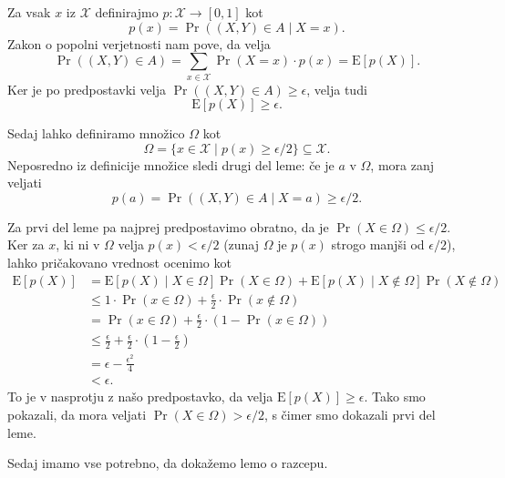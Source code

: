 \begin{dokaz}
    Za vsak $x$ iz $\mathcal{X}$ definirajmo $p: \mathcal{X} \rightarrow [0, 1]$ kot
    $$
    p(x) = \Pr((X, Y) \in A \mid X = x).
    $$
    Zakon o popolni verjetnosti nam pove, da velja
    $$
    \Pr((X, Y) \in A) = \sum_{x \in \mathcal{X}} \Pr(X = x) \cdot p(x) = \text{E}[p(X)].
    $$
    Ker je po predpostavki velja $\Pr((X, Y) \in A) \geq \epsilon$, velja tudi
    $$
    \text{E}[p(X)] \geq \epsilon.
    $$

    Sedaj lahko definiramo množico $\Omega$ kot
    $$
    \Omega = \{x \in \mathcal{X} \mid p(x) \geq \epsilon / 2\} \subseteq \mathcal{X}.
    $$
    Neposredno iz definicije množice sledi drugi del leme: če je $a$ v $\Omega$, mora zanj veljati
    $$
    p(a) = \Pr((X, Y) \in A \mid X = a) \geq \epsilon / 2.
    $$

    Za prvi del leme pa najprej predpostavimo obratno, da je $\Pr(X \in \Omega) \leq \epsilon / 2$.
    Ker za $x$, ki ni v $\Omega$ velja $p(x) < \epsilon / 2$ (zunaj $\Omega$ je $p(x)$ strogo manjši
    od $\epsilon / 2$), lahko pričakovano vrednost ocenimo kot
    \begin{align*}
        \text{E}[p(X)] &= \text{E}[p(X) \mid X \in \Omega] \Pr(X \in \Omega) +
            \text{E}[p(X) \mid X \notin \Omega ] \Pr(X \notin \Omega) \\
                       &\leq 1 \cdot \Pr(x \in \Omega) + \frac{\epsilon}{2} \cdot \Pr(x \notin \Omega) \\
                       &= \Pr(x \in \Omega) + \frac{\epsilon}{2} \cdot (1 - \Pr(x \in \Omega)) \\
                       &\leq \frac{\epsilon}{2} + \frac{\epsilon}{2} \cdot \left(1 - \frac{\epsilon}{2}\right) \\
                       &= \epsilon - \frac{\epsilon^2}{4} \\
                       &< \epsilon.
    \end{align*}
    To je v nasprotju z našo predpostavko, da velja $\text{E}[p(X)] \geq \epsilon$. Tako smo pokazali,
    da mora veljati $\Pr(X \in \Omega) > \epsilon / 2$, s čimer smo dokazali prvi del leme.
\end{dokaz}

Sedaj imamo vse potrebno, da dokažemo lemo o razcepu.

